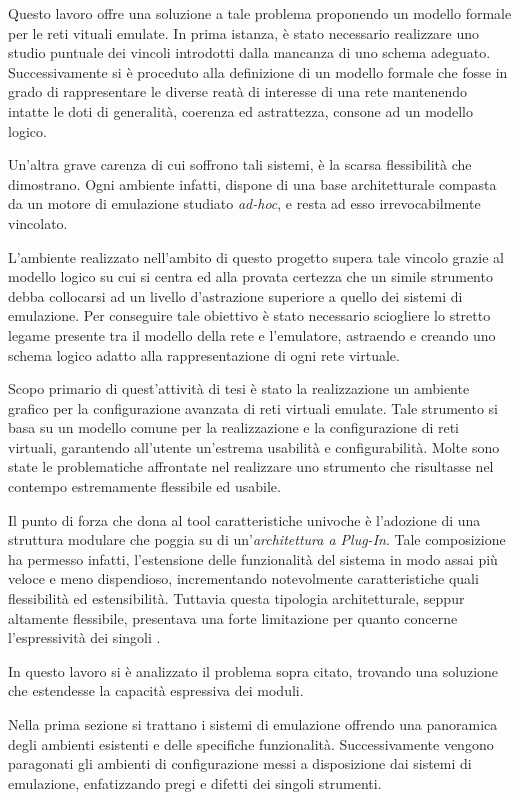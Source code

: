 Questo lavoro offre una soluzione a tale problema proponendo un modello formale per le reti vituali emulate.
In prima istanza, è stato necessario realizzare uno studio puntuale dei vincoli introdotti dalla mancanza di uno schema adeguato. Successivamente si è proceduto alla definizione di un modello formale che fosse in grado di rappresentare le diverse reatà di interesse di una rete mantenendo intatte le doti di generalità, coerenza ed astrattezza, consone ad un modello logico.

Un'altra grave carenza di cui soffrono tali sistemi, è la scarsa flessibilità che dimostrano. Ogni ambiente infatti, dispone di una base architetturale compasta da un motore di emulazione studiato \emph{ad-hoc}, e resta ad esso irrevocabilmente vincolato.

L'ambiente realizzato nell'ambito di questo progetto supera tale vincolo grazie al modello logico su cui si centra ed alla provata certezza che un simile strumento debba collocarsi ad un livello d'astrazione superiore a quello dei sistemi di emulazione.
Per conseguire tale obiettivo è stato necessario sciogliere lo stretto legame presente tra il modello della rete e l'emulatore, astraendo e creando uno schema logico adatto alla rappresentazione di ogni rete virtuale.

Scopo primario di quest'attività di tesi è stato la realizzazione un ambiente grafico per la configurazione avanzata di reti virtuali emulate.
Tale strumento si basa su un modello comune per la realizzazione e la configurazione di reti virtuali, garantendo all'utente un'estrema usabilità e configurabilità.
Molte sono state le problematiche affrontate nel realizzare uno strumento che risultasse nel contempo estremamente flessibile ed usabile.

Il punto di forza che dona al tool caratteristiche univoche è l'adozione di una struttura modulare che poggia su di un'\emph{architettura a Plug-In}. Tale composizione ha permesso infatti, l'estensione delle funzionalità del sistema in modo assai più veloce e meno dispendioso, incrementando notevolmente caratteristiche quali flessibilità ed estensibilità.
Tuttavia questa tipologia architetturale, seppur altamente flessibile, presentava una forte limitazione per quanto concerne l'espressività dei singoli \plugin{}. 

In questo lavoro si è analizzato il problema sopra citato, trovando una soluzione che estendesse la capacità espressiva dei moduli.


Nella prima sezione si trattano i sistemi di emulazione offrendo una panoramica degli ambienti esistenti e delle specifiche funzionalità. Successivamente vengono paragonati gli ambienti di configurazione messi a disposizione dai sistemi di emulazione, enfatizzando pregi e difetti dei singoli strumenti.

